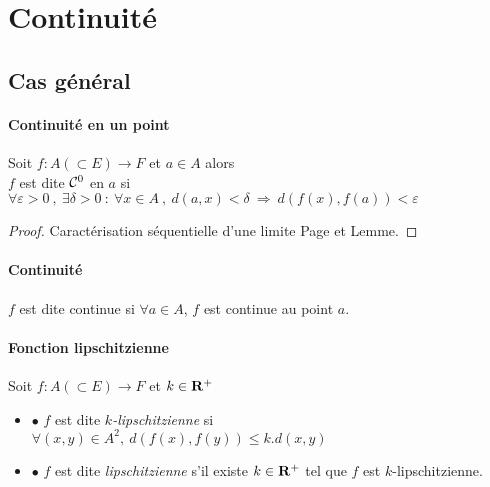  		
 \section{Continuité}
 
	\subsection{Cas général}
	
		\traitd
		\paragraph{Continuité en un point}
			Soit $f : A(\subset E) \rightarrow F$ et $a\in A$ alors\\
			$f$ est dite ${\mathcal{C}}^0$ en $a$ si $\forall \varepsilon >0 ~,~\exists \delta >0 ~:~ \forall x\in A ~,~d(a,x)<\delta	~
			\Rightarrow ~d(f(x),f(a))<\varepsilon$ 
		\trait
		
		 \medskip
		
		 \medskip
		
		
		\begin{proof}
		Caractérisation séquentielle d'une limite Page \pageref{CarSeqLim} et Lemme.
		\end{proof} 
		
		\newpage
		
		\traitd
		\paragraph{Continuité}
			$f$ est dite continue si $\forall a\in A$, $f$ est continue au point $a$.
		\traitdouble
		\paragraph{Fonction lipschitzienne}
			Soit $f:A(\subset E) \rightarrow F$ et $k\in {\mathbf{R}}^+$
			\begin{itemize}
				\item $\bullet $ $f$ est dite \emph{$k$-lipschitzienne} si $\forall (x,y) \in A^2 ,~d(f(x),f(y)) \leq k.d(x,y)$
				\item $\bullet $ $f$ est dite \emph{lipschitzienne} s'il existe $k\in{\mathbf{R}}^+$ tel que $f$ est $k$-lipschitzienne.
			\end{itemize}
		\trait
		
